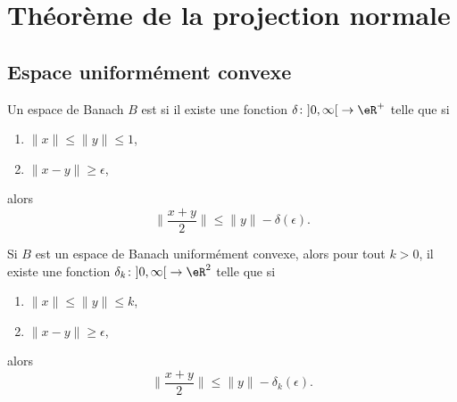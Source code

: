 \section{Théorème de la projection normale}

\subsection{Espace uniformément convexe}

\begin{definition}     \label{DEFooOPQBooBhufew}
	Un espace de Banach \( B\) est  si il existe une fonction \( \delta\colon \mathopen] 0 , \infty \mathclose[\to \eR^+\) telle que si
	\begin{enumerate}
		\item
		      \( \| x \|\leq \| y \|\leq 1\),
		\item
		      \( \| x-y \|\geq \epsilon\),
	\end{enumerate}
	alors
	\begin{equation}
		\| \frac{ x+y }{ 2 } \|\leq \| y \|-\delta(\epsilon).
	\end{equation}
\end{definition}

\begin{lemma}
	Si \( B\) est un espace de Banach uniformément convexe, alors pour tout \( k>0\), il existe une fonction \( \delta_k\colon \mathopen] 0 , \infty \mathclose[\to \eR^2\) telle que si
	\begin{enumerate}
		\item
		      \( \| x \|\leq \| y \|\leq k\),
		\item
		      \( \| x-y \|\geq \epsilon\),
	\end{enumerate}
	alors
	\begin{equation}
		\| \frac{ x+y }{ 2 } \|\leq \| y \|-\delta_k(\epsilon).
	\end{equation}
\end{lemma}

